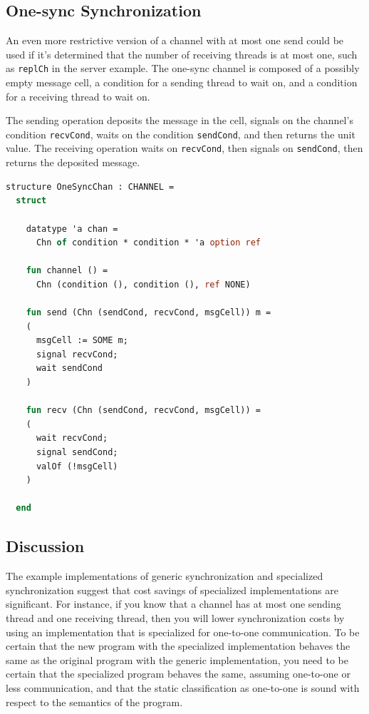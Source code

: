 \documentclass[letterpaper, 11pt]{report}
\begin{document}
\subsection{One-sync Synchronization}

An even more restrictive version of a channel with at most one send could be used if it's
determined that the number of receiving threads is at most one,
such as \lstinline{replCh} in the server example.
The one-sync channel is
composed of a possibly empty message cell, a condition for a sending thread to wait on,
and a condition for a receiving thread to wait on.

The sending operation deposits the message in the cell, signals on the channel's condition \lstinline{recvCond},
waits on the condition \lstinline{sendCond}, and then returns the unit value.
The receiving operation waits on \lstinline{recvCond},
then signals on \lstinline{sendCond}, then returns the deposited message.

\begin{lstlisting}[language=ML, mathescape]
  structure OneSyncChan : CHANNEL =
  struct

    datatype 'a chan =
      Chn of condition * condition * 'a option ref

    fun channel () =
      Chn (condition (), condition (), ref NONE)

    fun send (Chn (sendCond, recvCond, msgCell)) m =
    (
      msgCell := SOME m;
      signal recvCond;  
      wait sendCond
    )

    fun recv (Chn (sendCond, recvCond, msgCell)) =
    (
      wait recvCond;
      signal sendCond;
      valOf (!msgCell)
    )

  end
\end{lstlisting}

\subsection{Discussion}
The example implementations of generic synchronization and specialized synchronization suggest
that cost savings of specialized implementations are significant. For instance, if you know that
a channel has at most one sending thread and one receiving thread, then you will
lower synchronization costs by
using an implementation that is specialized for one-to-one communication. To be certain that
the new program with the specialized implementation behaves the same as the original program
with the generic implementation, you need to be certain that the
specialized program behaves the same, assuming one-to-one or less communication, and that
the static classification as one-to-one is sound with respect to the semantics of the program. 
\end{document}

